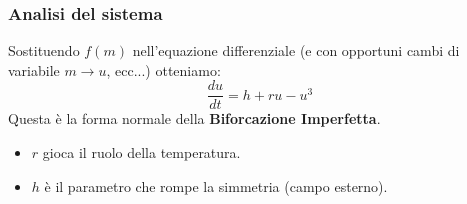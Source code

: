 \documentclass[openany]{book}
\theoremstyle{definition}
\theoremstyle{remark}
\begin{document}
\subsubsection*{Analisi del sistema}
Sostituendo $f(m)$ nell'equazione differenziale (e con opportuni cambi di variabile $m \to u$, ecc...) otteniamo:
\begin{equation}
    \frac{du}{dt} = h + ru - u^3
\end{equation}
Questa è la forma normale della \textbf{Biforcazione  Imperfetta}.
\begin{itemize}
    \item $r$ gioca il ruolo della temperatura.
    \item $h$ è il parametro che rompe la simmetria (campo esterno).
\end{itemize}
\end{document}
